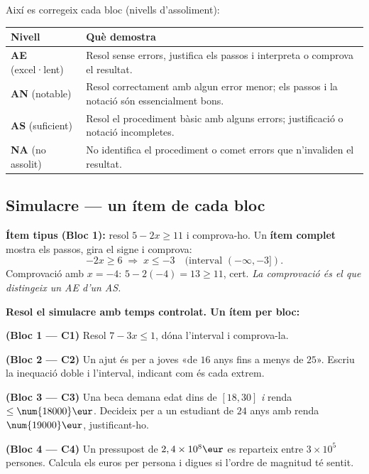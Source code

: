 \noindent Així es corregeix cada bloc (nivells d'assoliment):
\begin{center}
\renewcommand{\arraystretch}{1.3}
\begin{tabular}{p{2.4cm} p{10.2cm}}
\toprule
\textbf{Nivell} & \textbf{Què demostra} \\
\midrule
\textbf{AE} (excel·lent) & Resol sense errors, justifica els passos i interpreta o
comprova el resultat. \\
\textbf{AN} (notable) & Resol correctament amb algun error menor; els passos i la
notació són essencialment bons. \\
\textbf{AS} (suficient) & Resol el procediment bàsic amb alguns errors; justificació
o notació incompletes. \\
\textbf{NA} (no assolit) & No identifica el procediment o comet errors que
n'invaliden el resultat. \\
\bottomrule
\end{tabular}
\end{center}

\subsection{Simulacre — un ítem de cada bloc}

\begin{exemple}
\textbf{Ítem tipus (Bloc 1):} resol $5-2x\ge 11$ i comprova-ho. Un \textbf{ítem
complet} mostra els passos, gira el signe i comprova:
\[
-2x\ge 6 \;\Rightarrow\; x\le -3 \quad(\text{interval } (-\infty,-3]).
\]
Comprovació amb $x=-4$: $5-2(-4)=13\ge 11$, cert. \emph{La comprovació és el que
distingeix un AE d'un AS.}
\end{exemple}

\begin{exercicis}
\textbf{Resol el simulacre amb temps controlat. Un ítem per bloc:}
\begin{exlist}
  \item \textbf{(Bloc 1 — C1)} Resol $7-3x\le 1$, dóna l'interval i comprova-la.
  \item \textbf{(Bloc 2 — C2)} Un ajut és per a joves «de $16$ anys fins a menys de
        $25$». Escriu la inequació doble i l'interval, indicant com és cada extrem.
  \item \textbf{(Bloc 3 — C3)} Una beca demana edat dins de $[18,30]$ \emph{i} renda
        $\le\num{18000}\eur$. Decideix per a un estudiant de $24$ anys amb renda
        $\num{19000}\eur$, justificant-ho.
  \item \textbf{(Bloc 4 — C4)} Un pressupost de $2,4\times 10^{8}\eur$ es reparteix
        entre $3\times 10^{5}$ persones. Calcula els euros per persona i digues si
        l'ordre de magnitud té sentit.
\end{exlist}
\end{exercicis}


